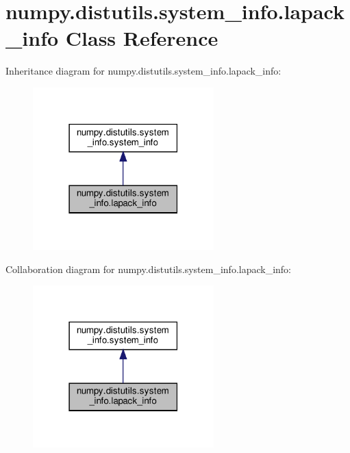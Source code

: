 \hypertarget{classnumpy_1_1distutils_1_1system__info_1_1lapack__info}{}\section{numpy.\+distutils.\+system\+\_\+info.\+lapack\+\_\+info Class Reference}
\label{classnumpy_1_1distutils_1_1system__info_1_1lapack__info}


Inheritance diagram for numpy.\+distutils.\+system\+\_\+info.\+lapack\+\_\+info\+:
\nopagebreak
\begin{figure}[H]
\begin{center}
\leavevmode
\includegraphics[width=198pt]{classnumpy_1_1distutils_1_1system__info_1_1lapack__info__inherit__graph}
\end{center}
\end{figure}


Collaboration diagram for numpy.\+distutils.\+system\+\_\+info.\+lapack\+\_\+info\+:
\nopagebreak
\begin{figure}[H]
\begin{center}
\leavevmode
\includegraphics[width=198pt]{classnumpy_1_1distutils_1_1system__info_1_1lapack__info__coll__graph}
\end{center}
\end{figure}
